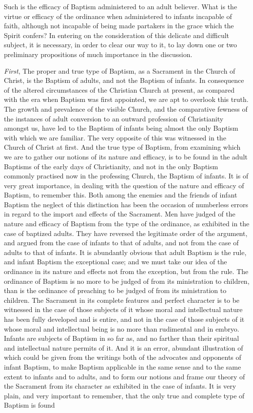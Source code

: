 \documentclass[
  english,
]{book}
\begin{document}
Such is the efficacy of Baptism administered to an adult believer. What is the virtue or efficacy of the ordinance when administered to infants incapable of faith, although not incapable of being made partakers in the grace which the Spirit confers? In entering on the consideration of this delicate and difficult subject, it is necessary, in order to clear our way to it, to lay down one or two preliminary propositions of much importance in the discussion.

\emph{First}, The proper and true type of Baptism, as a Sacrament in the Church of Christ, is the Baptism of adults, and not the Baptism of infants. In consequence of the altered circumstances of the Christian Church at present, as compared with the era when Baptism was first appointed, we are apt to overlook this truth. The growth and prevalence of the visible Church, and the comparative fewness of the instances of adult conversion to an outward profession of Christianity amongst us, have led to the Baptism of infants being almost the only Baptism with which we are familiar. The very opposite of this was witnessed in the Church of Christ at first. And the true type of Baptism, from examining which we are to gather our notions of its nature and efficacy, is to be found in the adult Baptisms of the early days of Christianity, and not in the only Baptism commonly practised now in the professing Church, the Baptism of infants. It is of very great importance, in dealing with the question of the nature and efficacy of Baptism, to remember this. Both among the enemies and the friends of infant Baptism the neglect of this distinction has been the occasion of numberless errors in regard to the import and effects of the Sacrament. Men have judged of the nature and efficacy of Baptism from the type of the ordinance, as exhibited in the case of baptized adults. They have reversed the legitimate order of the argument, and argued from the case of infants to that of adults, and not from the case of adults to that of infants. It is abundantly obvious that adult Baptism is the rule, and infant Baptism the exceptional case; and we must take our idea of the ordinance in its nature and effects not from the exception, but from the rule. The ordinance of Baptism is no more to be judged of from its ministration to children, than is the ordinance of preaching to be judged of from its ministration to children. The Sacrament in its complete features and perfect character is to be witnessed in the case of those subjects of it whose moral and intellectual nature has been fully developed and is entire, and not in the case of those subjects of it whose moral and intellectual being is no more than rudimental and in embryo. Infants are subjects of Baptism in so far as, and no farther than their spiritual and intellectual nature permits of it. And it is an error, abundant illustration of which could be given from the writings both of the advocates and opponents of infant Baptism, to make Baptism applicable in the same sense and to the same extent to infants and to adults, and to form our notions and frame our theory of the Sacrament from its character as exhibited in the case of infants. It is very plain, and very important to remember, that the only true and complete type of Baptism is found 
\end{document}
